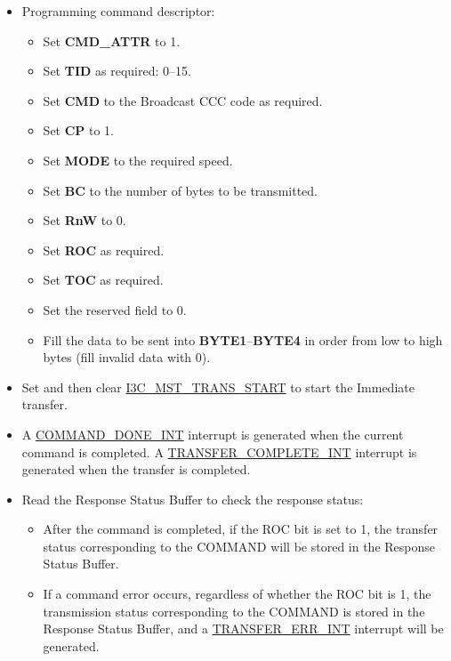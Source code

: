 \documentclass[main\_\_EN.tex]{subfiles}
\begin{document}
\begin{itemize}
    \item Programming command descriptor:
    \begin{itemize}
        \item Set \textbf{CMD\_ATTR} to 1.
        \item Set \textbf{TID} as required: 0–15.
        \item Set \textbf{CMD} to the Broadcast CCC code as required.
        \item Set \textbf{CP} to 1.
        \item Set \textbf{MODE} to the required speed.
        \item Set \textbf{BC} to the number of bytes to be transmitted.
        \item Set \textbf{RnW} to 0.
        \item Set \textbf{ROC} as required.
        \item Set \textbf{TOC} as required.
        \item Set the reserved field to 0.
        \item Fill the data to be sent into \textbf{BYTE1}–\textbf{BYTE4} in order from low to high bytes (fill invalid data with 0).
    \end{itemize}
    \item Set and then clear \hyperref[fielddesc:I3CMSTREGTRANSSTART]{I3C\_MST\_TRANS\_START} to start the Immediate transfer.
    \item A \hyperref[int:COMMANDDONEINT]{COMMAND\_DONE\_INT} interrupt is generated when the current command is completed. A \hyperref[int:TRANSFERCOMPLETEINT]{TRANSFER\_COMPLETE\_INT} interrupt is generated when the transfer is completed.
    \item Read the Response Status Buffer to check the response status:
    \begin{itemize}
        \item After the command is completed, if the ROC bit is set to 1, the transfer status corresponding to the COMMAND will be stored in the Response Status Buffer.
        \item If a command error occurs, regardless of whether the ROC bit is 1, the transmission status corresponding to the COMMAND is stored in the Response Status Buffer, and a \hyperref[int:TRANSFERERRINT]{TRANSFER\_ERR\_INT} interrupt will be generated.
    \end{itemize}
\end{itemize}
\end{document}
